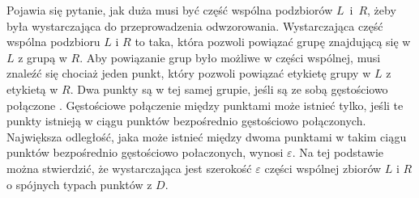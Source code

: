Pojawia się pytanie, jak duża musi być część wspólna podzbiorów \mbox{$ L $ i $ R $}, żeby była wystarczająca do przeprowadzenia odwzorowania. Wystarczająca część wspólna podzbioru $ L $ i $ R $ to taka, która pozwoli powiązać grupę znajdującą się w $ L $ z grupą w $ R $. Aby powiązanie grup było możliwe w części wspólnej, musi znaleźć się chociaż jeden punkt, który pozwoli powiązać etykietę grupy w $ L $ z etykietą w $ R $. Dwa punkty są w tej samej grupie, jeśli są ze sobą gęstościowo połączone \cite{dbscan}. Gęstościowe połączenie między punktami może istnieć tylko, jeśli te punkty istnieją w ciągu punktów bezpośrednio gęstościowo połączonych. Największa odległość, jaka może istnieć między dwoma punktami w takim ciągu punktów bezpośrednio gęstościowo połaczonych, wynosi $ \varepsilon $. Na tej podstawie można stwierdzić, że wystarczająca jest szerokość $ \varepsilon $ części wspólnej zbiorów $ L $ i $ R $ o spójnych typach punktów z $ D $.\par

